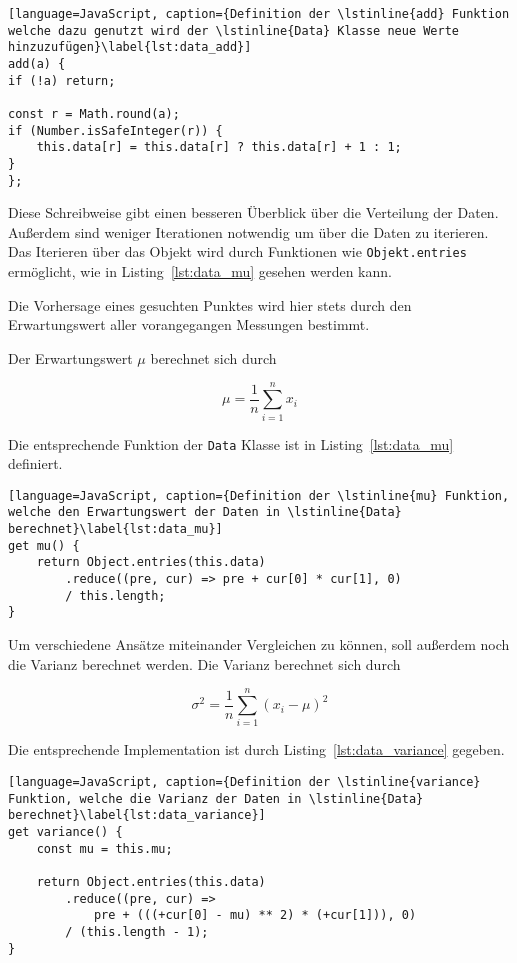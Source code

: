 \begin{lstlisting}[language=JavaScript, caption={Definition der \lstinline{add} Funktion welche dazu genutzt wird der \lstinline{Data} Klasse neue Werte hinzuzufügen}\label{lst:data_add}]
add(a) {
if (!a) return;

const r = Math.round(a);
if (Number.isSafeInteger(r)) {
    this.data[r] = this.data[r] ? this.data[r] + 1 : 1;
}
};
\end{lstlisting}

Diese Schreibweise gibt einen besseren Überblick über die Verteilung der Daten.
Außerdem sind weniger Iterationen notwendig um über die Daten zu iterieren.
Das Iterieren über das Objekt wird durch Funktionen wie \lstinline{Objekt.entries} ermöglicht, wie in Listing~\ref{lst:data_mu} gesehen werden kann.

Die Vorhersage eines gesuchten Punktes wird hier stets durch den Erwartungswert aller vorangegangen Messungen bestimmt.

Der Erwartungswert $\mu$ berechnet sich durch

\begin{equation}
    \mu = \frac{1}{n} \sum_{i=1}^n{x_i}
\end{equation}

Die entsprechende Funktion der \lstinline{Data} Klasse ist in Listing~\ref{lst:data_mu} definiert.

\begin{lstlisting}[language=JavaScript, caption={Definition der \lstinline{mu} Funktion, welche den Erwartungswert der Daten in \lstinline{Data} berechnet}\label{lst:data_mu}]
get mu() {
    return Object.entries(this.data)
        .reduce((pre, cur) => pre + cur[0] * cur[1], 0)
        / this.length;
}
\end{lstlisting}

Um verschiedene Ansätze miteinander Vergleichen zu können, soll außerdem noch die Varianz berechnet werden.
Die Varianz berechnet sich durch

\begin{equation}
    \sigma^2 = \frac{1}{n} \sum_{i=1}^n(x_i - \mu)^2
\end{equation}

Die entsprechende Implementation ist durch Listing~\ref{lst:data_variance} gegeben.

\begin{lstlisting}[language=JavaScript, caption={Definition der \lstinline{variance} Funktion, welche die Varianz der Daten in \lstinline{Data} berechnet}\label{lst:data_variance}]
get variance() {
    const mu = this.mu;

    return Object.entries(this.data)
        .reduce((pre, cur) =>
            pre + (((+cur[0] - mu) ** 2) * (+cur[1])), 0)
        / (this.length - 1);
}
\end{lstlisting}

